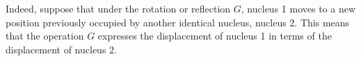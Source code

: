 Indeed, suppose that under the rotation or reflection $G$, nucleus 1 moves to a new position previously occupied by another identical nucleus, nucleus 2. This means that the operation $G$ expresses the displacement of nucleus 1 in terms of the displacement of nucleus 2.
